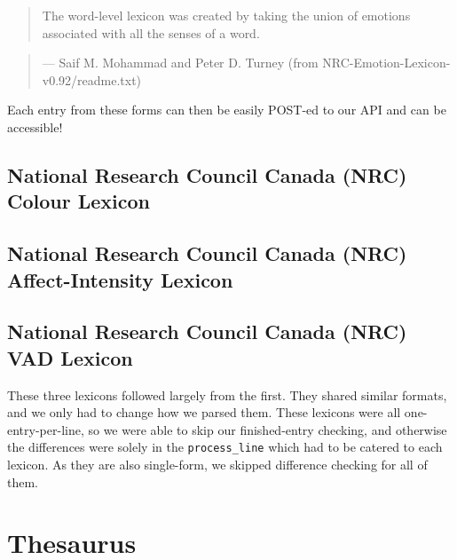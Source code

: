 \documentclass[11pt, twoside, reqno]{book}
\begin{document}
\begin{quote}
The word-level lexicon was created by taking the union of emotions associated with all the senses of a word.
\end{quote}

\begin{quote}
— Saif M. Mohammad and Peter D. Turney (from NRC-Emotion-Lexicon-v0.92/readme.txt)
\end{quote}

Each entry from these forms can then be easily POST-ed to our API and can be accessible!

\section{National Research Council Canada (NRC) Colour Lexicon}

\section{National Research Council Canada (NRC) Affect-Intensity Lexicon}

\section{National Research Council Canada (NRC) VAD Lexicon}

These three lexicons followed largely from the first. They shared similar formats, and we only had to change how we parsed them. These lexicons were all one-entry-per-line, so we were able to skip our finished-entry checking, and otherwise the differences were solely in the \texttt{process\_line} which had to be catered to each lexicon. As they are also single-form, we skipped difference checking for all of them.


\chapter{Thesaurus}


\end{document}

